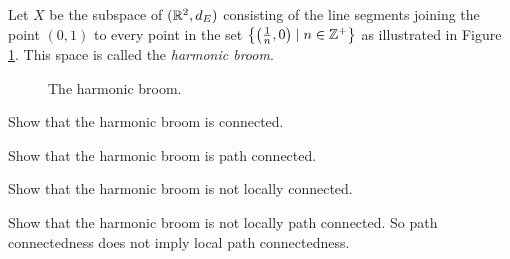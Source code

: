 \begin{comment}

\ExerciseSolution Suppose $\{A_{\alpha}\}$ for $\alpha$ in some indexing set $I$ is a collection of path connected subsets of $X$ such that $\bigcap_{\alpha \in I} A_{\alpha} \neq \emptyset$. Let $A = \bigcup_{\alpha \in I} A_{\alpha}$ and let $x, y \in A$. If $x$ and $y$ are both in $A_{\alpha}$ for some $\alpha \in I$, then the fact that $A_{\alpha}$ is path connected implies that there is a path between $x$ and $y$. So suppose, without loss of generality, that $x \in A_{\beta}$ and $y \in A_{\gamma}$ for some $\beta \neq \gamma$ in $I$. Let $z \in \bigcap_{\alpha \in I} A_{\alpha}$. The fact that $z \in A_{\beta}$ implies that there is a path in $A_{\beta}$ from $x$ to $z$. Also, $z \in A_{\gamma}$ so there is a path in $A_{\gamma}$ from $z$ to $y$. By transitivity, there is a path in $A$ from $x$ to $y$ and so $A$ is path connected. 

\end{comment}


\item \label{ex:PC_harmonic_broom} Let $X$ be the subspace of $(\mathbb{R}^2, d_E)$ consisting of the line segments joining the point $(0,1)$ to every point in the set $\left\{\left(\frac{1}{n}, 0\right) \mid n \in \mathbb{Z}^+\right\}$ as illustrated in Figure \ref{F:harmonic_broom}. This space is called the \emph{harmonic broom}.  
\begin{figure}[h]
\begin{center}
\end{center}
\caption{The harmonic broom.}
\label{F:harmonic_broom}
\end{figure}
\ba

\item Show that the harmonic broom is connected.

\item Show that the harmonic broom is path connected.

\item Show that the harmonic broom is not locally connected. 

\item Show that the harmonic broom is not locally path connected. So path connectedness does not imply local path connectedness. 

\ea

